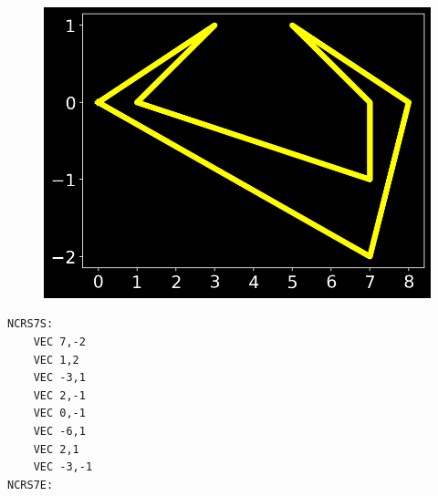 \begin{minipage}[b]{0.48\linewidth}
\begin{figure}[H]
    \centering
    \begin{adjustbox}{width=4.5cm,center}
      \includegraphics[width=12cm]{src/cursors/final_cursor_6.png}%
    \end{adjustbox}
\end{figure}
\end{minipage}
\begin{minipage}[b]{0.48\linewidth}
\begin{lstlisting}
NCRS7S:
	VEC 7,-2
	VEC 1,2
	VEC -3,1
	VEC 2,-1
	VEC 0,-1
	VEC -6,1
	VEC 2,1
	VEC -3,-1
NCRS7E:
\end{lstlisting}
\end{minipage}


